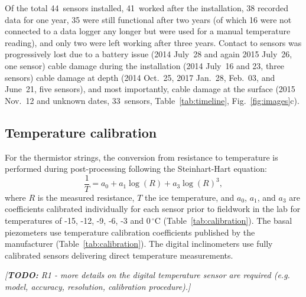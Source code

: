 \documentclass[utf8]{article}
\newcommand{\todo}[1]{\textcolor{c3}{\emph{[\textbf{TODO:} #1]}}}
\begin{document}
    Of the total 44~sensors installed, 41~worked after the installation, 38
    recorded data for one year, 35 were still functional after two years (of
    which 16 were not connected to a data logger any longer but were used for a
    manual temperature reading), and only two were left
    working after three years. Contact to sensors was progressively lost due to a
    battery issue (2014 July~28 and again 2015 July~26, one sensor) cable
    damage during the installation (2014 July~16 and 23, three sensors) cable
    damage at depth (2014 Oct.~25, 2017 Jan.~28, Feb.~03, and June~21, five
    sensors), and most importantly, cable damage at the surface (2015 Nov.~12
    and unknown dates, 33~sensors, Table~\ref{tab:timeline},
    Fig.~\ref{fig:images}c).


\subsection{Temperature calibration}


    For the thermistor strings, the conversion from resistance to temperature
    is performed during post-processing following the Steinhart-Hart equation:
    \begin{equation}
      \frac{1}{T} = a_0 + a_1 \log(R) + a_3 \log(R)^3,
    \end{equation}
    where $R$ is the measured resistance, $T$ the ice temperature, and $a_0$,
    $a_1$, and $a_3$ are coefficients calibrated individually for each sensor
    prior to fieldwork in the lab for temperatures of -15, -12, -9, -6, -3 and
    0\,$^\circ$C (Table~\ref{tab:calibration}). The basal piezometers use
    temperature calibration coefficients published by the manufacturer
    (Table~\ref{tab:calibration}). The digital inclinometers use fully
    calibrated sensors delivering direct temperature measurements.

    \todo{R1 - more details on the digital temperature sensor are required
          (e.g. model, accuracy, resolution, calibration procedure).}
\end{document}

